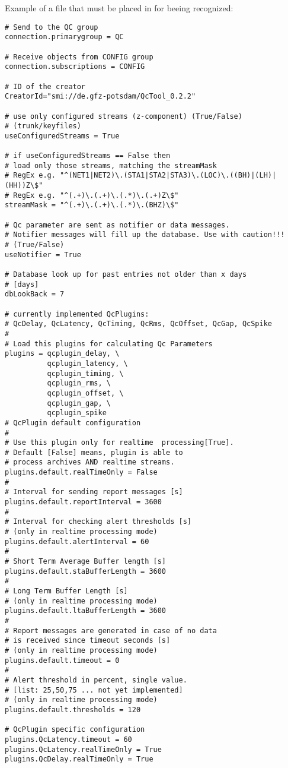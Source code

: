 \noindent
Example of a  file that must be placed in  for beeing recognized:
\begin{small}
\begin{verbatim}
# Send to the QC group
connection.primarygroup = QC

# Receive objects from CONFIG group
connection.subscriptions = CONFIG

# ID of the creator
CreatorId="smi://de.gfz-potsdam/QcTool_0.2.2"

# use only configured streams (z-component) (True/False) 
# (trunk/keyfiles)
useConfiguredStreams = True

# if useConfiguredStreams == False then
# load only those streams, matching the streamMask
# RegEx e.g. "^(NET1|NET2)\.(STA1|STA2|STA3)\.(LOC)\.((BH)|(LH)|(HH))Z\$"
# RegEx e.g. "^(.+)\.(.+)\.(.*)\.(.+)Z\$"
streamMask = "^(.+)\.(.+)\.(.*)\.(BHZ)\$"

# Qc parameter are sent as notifier or data messages.
# Notifier messages will fill up the database. Use with caution!!!
# (True/False)
useNotifier = True

# Database look up for past entries not older than x days
# [days]
dbLookBack = 7

# currently implemented QcPlugins:
# QcDelay, QcLatency, QcTiming, QcRms, QcOffset, QcGap, QcSpike
#
# Load this plugins for calculating Qc Parameters
plugins = qcplugin_delay, \
          qcplugin_latency, \
          qcplugin_timing, \
          qcplugin_rms, \
          qcplugin_offset, \
          qcplugin_gap, \
          qcplugin_spike
# QcPlugin default configuration
#
# Use this plugin only for realtime  processing[True].
# Default [False] means, plugin is able to
# process archives AND realtime streams.
plugins.default.realTimeOnly = False
#
# Interval for sending report messages [s]
plugins.default.reportInterval = 3600
#
# Interval for checking alert thresholds [s]
# (only in realtime processing mode)
plugins.default.alertInterval = 60
#
# Short Term Average Buffer length [s]
plugins.default.staBufferLength = 3600
#
# Long Term Buffer Length [s]
# (only in realtime processing mode)
plugins.default.ltaBufferLength = 3600
#
# Report messages are generated in case of no data
# is received since timeout seconds [s]
# (only in realtime processing mode)
plugins.default.timeout = 0
#
# Alert threshold in percent, single value.
# [list: 25,50,75 ... not yet implemented]
# (only in realtime processing mode)
plugins.default.thresholds = 120

# QcPlugin specific configuration
plugins.QcLatency.timeout = 60
plugins.QcLatency.realTimeOnly = True
plugins.QcDelay.realTimeOnly = True
\end{verbatim}
\end{small}

